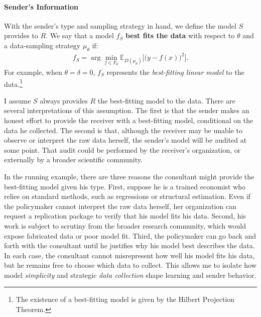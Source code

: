 \documentclass[11pt,dvipsnames]{article}
\begin{document}
\paragraph{Sender's Information}
With the sender's type and sampling strategy in hand, we define the model $S$ provides to $R$.
We say that a model $f_S$ \textbf{best fits the data} with respect to $\theta$ and a data-sampling strategy $\mu_\theta$ if:
\begin{align*}
f_S= \arg\min_{f \in F_\theta} \mathbb{E}_{D(\mu_\theta)}\big[\big(y-f(x)\big)^2\big].
\end{align*}
For example, when $\theta = \delta = 0$, $f_S$ represents the \emph{best-fitting linear model} to the data.\footnote{The existence of a best-fitting model is given by the Hilbert Projection Theorem.}

I assume $S$ always provides $R$ the best-fitting model to the data.
There are several interpretations of this assumption. The first is that the sender makes an honest effort to provide the receiver with a best-fitting model, conditional on the data he collected.
The second is that, although the receiver may be unable to observe or interpret the raw data herself, the sender's model will be audited at some point.
That audit could be performed by the receiver's organization, or externally by a broader scientific community.

In the running example, there are three reasons the consultant might provide the best-fitting model given his type.
First, suppose he is a trained economist who relies on standard methods, such as regressions or structural estimation.
Even if the policymaker cannot interpret the raw data herself, her organization can request a replication package to verify that his model fits his data.
Second, his work is subject to scrutiny from the broader research community, which would expose fabricated data or poor model fit.
Third, the policymaker can go back and forth with the consultant until he justifies why his model best describes the data.
In each case, the consultant cannot misrepresent how well his model fits his data, but he remains free to choose which data to collect.
This allows me to isolate how model \emph{simplicity} and strategic \emph{data collection} shape learning and sender behavior.
\end{document}
